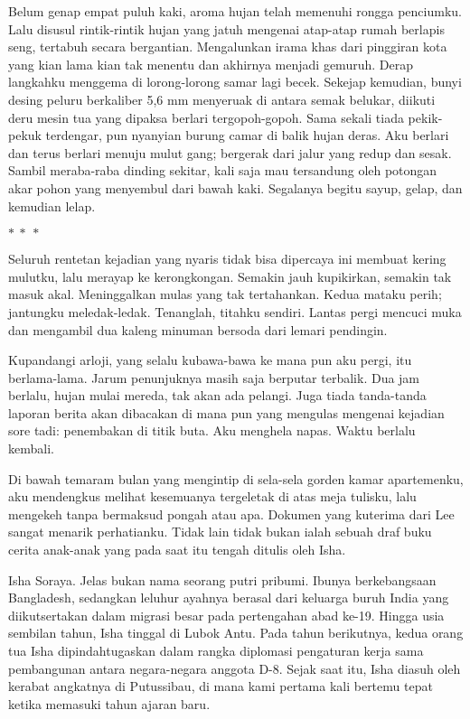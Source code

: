 \documentclass[smalldemyvopaper,11pt,twoside,onecolumn,openright,extrafontsizes]{memoir}
\newcommand\separator{
  \begin{center}
    \(\ast~\ast~\ast\)
  \end{center}
}
\begin{document}

Belum genap empat puluh kaki, aroma hujan telah memenuhi rongga penciumku. Lalu disusul rintik-rintik hujan yang jatuh mengenai atap-atap rumah berlapis seng, tertabuh secara bergantian. Mengalunkan irama khas dari pinggiran kota yang kian lama kian tak menentu dan akhirnya menjadi gemuruh. Derap langkahku menggema di lorong-lorong samar lagi becek. Sekejap kemudian, bunyi desing peluru berkaliber 5,6 mm menyeruak di antara semak belukar, diikuti deru mesin tua yang dipaksa berlari tergopoh-gopoh. Sama sekali tiada pekik-pekuk terdengar, pun nyanyian burung camar di balik hujan deras. Aku berlari dan terus berlari menuju mulut gang; bergerak dari jalur yang redup dan sesak. Sambil meraba-raba dinding sekitar, kali saja mau tersandung oleh potongan akar pohon yang menyembul dari bawah kaki. Segalanya begitu sayup, gelap, dan kemudian lelap.

\separator{}


\noindent Seluruh rentetan kejadian yang nyaris tidak bisa dipercaya ini membuat kering mulutku, lalu merayap ke kerongkongan. Semakin jauh kupikirkan, semakin tak masuk akal. Meninggalkan mulas yang tak tertahankan. Kedua mataku perih; jantungku meledak-ledak. Tenanglah, titahku sendiri. Lantas pergi mencuci muka dan mengambil dua kaleng minuman bersoda dari lemari pendingin.


Kupandangi arloji, yang selalu kubawa-bawa ke mana pun aku pergi, itu berlama-lama. Jarum penunjuknya masih saja berputar terbalik. Dua jam berlalu, hujan mulai mereda, tak akan ada pelangi. Juga tiada tanda-tanda laporan berita akan dibacakan di mana pun yang mengulas mengenai kejadian sore tadi: penembakan di titik buta. Aku menghela napas. Waktu berlalu kembali.


Di bawah temaram bulan yang mengintip di sela-sela gorden kamar apartemenku, aku mendengkus melihat kesemuanya tergeletak di atas meja tulisku, lalu mengekeh tanpa bermaksud pongah atau apa. Dokumen yang kuterima dari Lee sangat menarik perhatianku. Tidak lain tidak bukan ialah sebuah draf buku cerita anak-anak yang pada saat itu tengah ditulis oleh Isha.

Isha Soraya. Jelas bukan nama seorang putri pribumi. Ibunya berkebangsaan Bangladesh, sedangkan leluhur ayahnya berasal dari keluarga buruh India yang diikutsertakan dalam migrasi besar pada pertengahan abad ke-19. Hingga usia sembilan tahun, Isha tinggal di Lubok Antu. Pada tahun berikutnya, kedua orang tua Isha dipindahtugaskan dalam rangka diplomasi pengaturan kerja sama pembangunan antara negara-negara anggota D-8. Sejak saat itu, Isha diasuh oleh kerabat angkatnya di Putussibau, di mana kami pertama kali bertemu tepat ketika memasuki tahun ajaran baru.
\end{document}
